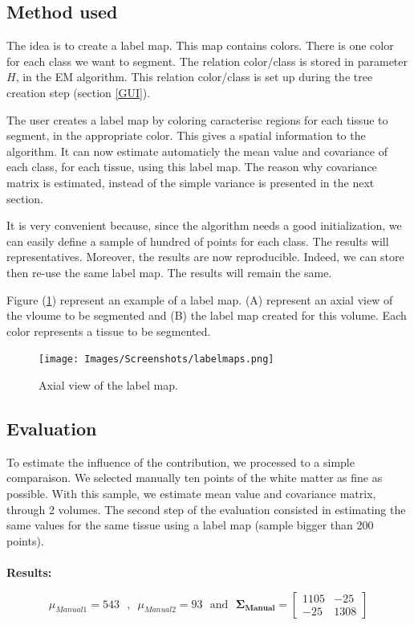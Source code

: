 \subsection{Method used}
%
The idea is to create a label map. This map contains colors. There is one color for each class we want to segment. The relation color/class is stored in parameter $H$, in the EM algorithm. This relation color/class is set up during the tree creation step (section  \ref{GUI}).
\par
The user creates a label map by coloring caracterisc regions for each tissue to segment, in the appropriate color. This gives a spatial information to the algorithm. It can now estimate automaticly the mean value and covariance of each class, for each tissue, using this label map. The reason why covariance matrix is estimated, instead of the simple variance is presented in the next section.
\par 
It is very convenient because, since the algorithm needs a good initialization, we can easily define a sample of hundred of points for each class. The results will representatives. Moreover, the results are now reproducible. Indeed, we can store then re-use the same label map. The results will remain the same.

Figure (\ref{fig:labelmaps}) represent an example of a label map. (A) represent an axial view of the vloume to be segmented and (B) the label map created for this volume. Each color represents a tissue to be segmented.

\begin{figure}\centering
  \texttt{[image: Images/Screenshots/labelmaps.png]}
  \caption{Axial view of the label map.}\label{fig:labelmaps}
\end{figure}
\subsection{Evaluation}
To estimate the influence of the contribution, we processed to a simple comparaison. We selected manually ten points of the white matter as fine as possible. With this sample, we estimate mean value and covariance matrix, through 2 volumes. The second step of the evaluation consisted in estimating the same values for the same tissue using a label map (sample bigger than 200 points). \\ \\
\textbf{Results:}

\begin{equation*}
\mu_{Manual1} =  543 \mbox{~~,~~} \mu_{Manual2} =  93 \mbox{~~and~~} \mathbf{\Sigma_{Manual}} = 
 \begin{bmatrix}
   1105 & -25 \\
   -25 & 1308
 \end{bmatrix}
\end{equation*}

